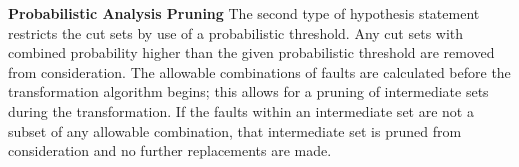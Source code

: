 \textbf{Probabilistic Analysis Pruning} The second type of hypothesis statement restricts the cut sets by use of a probabilistic threshold. Any cut sets with combined probability higher than the given probabilistic threshold are removed from consideration. The allowable combinations of faults are calculated before the transformation algorithm begins; this allows for a pruning of intermediate sets during the transformation. If the faults within an intermediate set are not a subset of any allowable combination, that intermediate set is pruned from consideration and no further replacements are made. 

